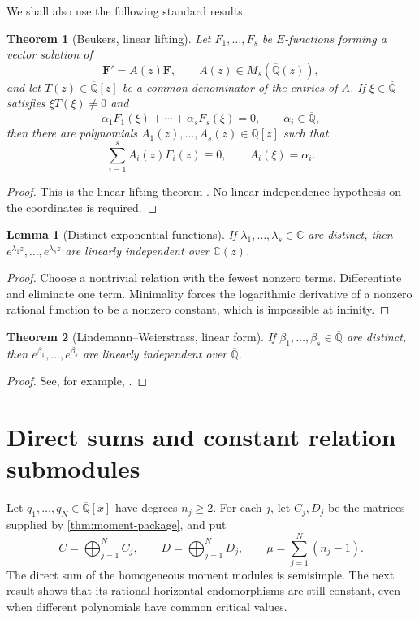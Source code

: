 \documentclass[11pt]{article}
\numberwithin{equation}{section}
\newtheorem{theorem}{Theorem}[section]
\newtheorem{lemma}[lemma]{Lemma}
\theoremstyle{definition}
\theoremstyle{remark}
\newcommand{\C}{\mathbb C}
\newcommand{\Qbar}{\overline{\mathbb Q}}
\begin{document}
We shall also use the following standard results.

\begin{theorem}[Beukers, linear lifting]\label{thm:Beukers}
Let $F_1,\ldots,F_s$ be $E$-functions forming a vector solution of
\[
  \mathbf F'=A(z)\mathbf F,
  \qquad A(z)\in M_s(\Qbar(z)),
\]
and let $T(z)\in\Qbar[z]$ be a common denominator of the entries of $A$.
If $\xi\in\Qbar$ satisfies $\xi T(\xi)\ne0$ and
\[
  \alpha_1F_1(\xi)+\cdots+\alpha_sF_s(\xi)=0,
  \qquad \alpha_i\in\Qbar,
\]
then there are polynomials $A_1(z),\ldots,A_s(z)\in\Qbar[z]$ such that
\[
  \sum_{i=1}^s A_i(z)F_i(z)\equiv0,
  \qquad A_i(\xi)=\alpha_i.
\]
\end{theorem}

\begin{proof}
This is the linear lifting theorem
\cite[Theorem~3.2 and Lemma~3.1]{Beukers}.  No linear independence
hypothesis on the coordinates is required.
\end{proof}

\begin{lemma}[Distinct exponential functions]\label{lem:distinct-exponentials}
If $\lambda_1,\ldots,\lambda_s\in\C$ are distinct, then
$e^{\lambda_1z},\ldots,e^{\lambda_sz}$ are linearly independent over
$\C(z)$.
\end{lemma}

\begin{proof}
Choose a nontrivial relation with the fewest nonzero terms.  Differentiate
and eliminate one term.  Minimality forces the logarithmic derivative of a
nonzero rational function to be a nonzero constant, which is impossible at
infinity.
\end{proof}

\begin{theorem}[Lindemann--Weierstrass, linear form]
\label{thm:Lindemann-Weierstrass}
If $\beta_1,\ldots,\beta_s\in\Qbar$ are distinct, then
$e^{\beta_1},\ldots,e^{\beta_s}$ are linearly independent over $\Qbar$.
\end{theorem}

\begin{proof}
See, for example, \cite[Chapter~1]{Baker}.
\end{proof}

\section{Direct sums and constant relation submodules}
\label{sec:direct-sums}

Let $q_1,\ldots,q_N\in\Qbar[x]$ have degrees $n_j\ge2$.  For each $j$,
let $C_j,D_j$ be the matrices supplied by \cref{thm:moment-package}, and
put
\begin{equation}\label{eq:block-CD}
  C=\bigoplus_{j=1}^{N}C_j,
  \qquad
  D=\bigoplus_{j=1}^{N}D_j,
  \qquad
  \mu=\sum_{j=1}^{N}(n_j-1).
\end{equation}
The direct sum of the homogeneous moment modules is semisimple.  The next
result shows that its rational horizontal endomorphisms are still constant,
even when different polynomials have common critical values.
\end{document}

